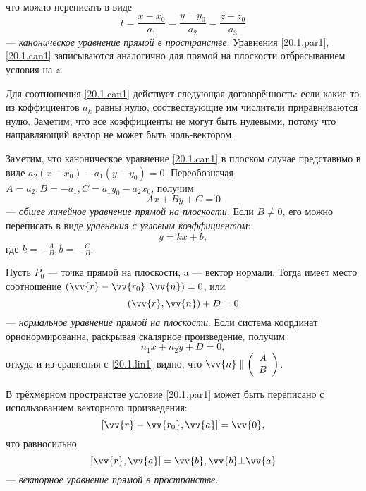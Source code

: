 что можно переписать в виде
\begin{equation}\label{20.1.can1}
t=\frac{x-x_0}{a_1}=\frac{y-y_0}{a_2}=\frac{z-z_0}{a_3}
\end{equation}
--- \textit{каноническое уравнение прямой в пространстве}.
  Уравнения \eqref{20.1.par1}, \eqref{20.1.can1} записываются аналогично для прямой на плоскости отбрасыванием условия на $z$.
  \begin{notion}
  Для соотношения \eqref{20.1.can1} действует следующая договорённость: если какие-то из коффициентов $a_k$ равны нулю, соотвествующие им числители приравниваются нулю. Заметим, что все коэффициенты не могут быть нулевыми, потому что направляющий вектор не может быть ноль-вектором.
  \end{notion}
  
Заметим, что каноническое уравнение \eqref{20.1.can1} в плоском случае представимо в виде $a_2(x-x_0)-a_1(y-y_0)=0$. Переобозначая $A=a_2, B=-a_1, C=a_1y_0-a_2x_0$, получим
  \begin{equation}\label{20.1.lin1}
  Ax+By+C=0
  \end{equation}
  --- \textit{общее линейное уравнение прямой на плоскости}. Если $B\neq0$, его можно переписать в виде \textit{уравнения с угловым коэффициентом}:
  \begin{equation}\label{20.1.ang1}
  y=kx+b,
  \end{equation}
  где $k=-\frac AB, b=-\frac CB$.
    
  Пусть $P_0$ --- точка прямой на плоскости, a  --- вектор нормали. Тогда имеет место соотношение $(\vv{r}-\vv{r_0},\vv{n})=0$, или
  \begin{equation}\label{20.1.norm1}
  (\vv{r},\vv{n})+D=0
  \end{equation}
  --- \textit{нормальное уравнение прямой на плоскости}. Если система координат орнонормированна, раскрывая скалярное произведение, получим
  \begin{equation}
  n_1x+n_2y+D=0,
  \end{equation}
откуда и из сравнения с \eqref{20.1.lin1} видно, что $\vv{n}\parallel\left(\begin{array}{crl}
A\\
B
\end{array}\right)$.   

  В трёхмерном пространстве условие \eqref{20.1.par1} может быть переписано с использованием векторного произведения:
  \begin{equation}\label{20.1.vect1}
  [\vv{r}-\vv{r_0},\vv{a}]=\vv{0}, 
  \end{equation}
  что равносильно
  \begin{equation}\label{20.1.vect2}
  [\vv{r},\vv{a}]=\vv{b}, \vv{b}\bot\vv{a}
  \end{equation}
  --- \textit{векторное уравнение прямой в пространстве}.
  
